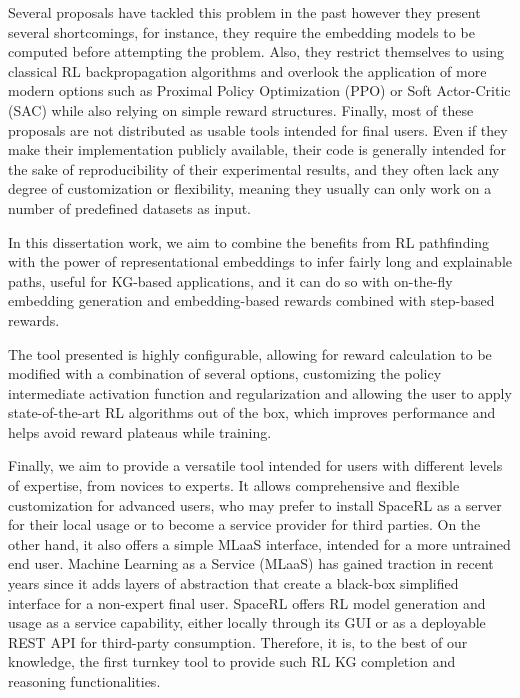Several proposals have tackled this problem in the past \cite{xiong2017deeppath, das2017go, lin2018multi, xian2019reinforcement} however they present several shortcomings, for instance, they require the embedding models to be computed before attempting the problem. Also, they restrict themselves to using classical RL backpropagation algorithms and overlook the application of more modern options such as Proximal Policy Optimization (PPO)\cite{schulman2017proximal} or Soft Actor-Critic (SAC) \cite{haarnoja2018soft} while also relying on simple reward structures. Finally, most of these proposals are not distributed as usable tools intended for final users. Even if they make their implementation publicly available, their code is generally intended for the sake of reproducibility of their experimental results, and they often lack any degree of customization or flexibility, meaning they usually can only work on a number of predefined datasets as input.

In this dissertation work, we aim to combine the benefits from RL pathfinding with the power of representational embeddings to infer fairly long and explainable paths, useful for KG-based applications, and it can do so with on-the-fly embedding generation and embedding-based rewards combined with step-based rewards.

The tool presented is highly configurable, allowing for reward calculation to be modified with a combination of several options, customizing the policy intermediate activation function and regularization and allowing the user to apply state-of-the-art RL algorithms out of the box, which improves performance and helps avoid reward plateaus while training.

Finally, we aim to provide a versatile tool intended for users with different levels of expertise, from novices to experts. It allows comprehensive and flexible customization for advanced users, who may prefer to install SpaceRL as a server for their local usage or to become a service provider for third parties. On the other hand, it also offers a simple MLaaS interface, intended for a more untrained end user. Machine Learning as a Service (MLaaS) has gained traction in recent years since it adds layers of abstraction that create a black-box simplified interface for a non-expert final user. SpaceRL offers RL model generation and usage as a service capability, either locally through its GUI or as a deployable REST API for third-party consumption. Therefore, it is, to the best of our knowledge, the first turnkey tool to provide such RL KG completion and reasoning functionalities.

